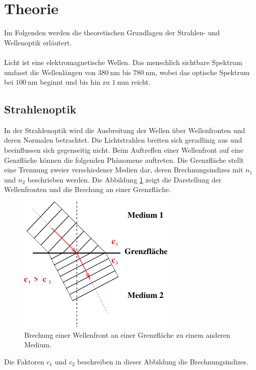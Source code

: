 \section{Theorie}

    Im Folgenden werden die theoretischen Grundlagen der Strahlen- und Wellenoptik erläutert.\\
    \\
    Licht ist eine elektromagnetische Wellen.
    Das menschlich sichtbare Spektrum umfasst die Wellenlängen von $\SI{380}{\nano\meter}$ bis $\SI{780}{\nano\meter}$,
    wobei das optische Spektrum bei $\SI{100}{\nano\meter}$ beginnt und bis hin zu $\SI{1}{\milli\meter}$ reicht.

\subsection{Strahlenoptik}

    In der Strahlenoptik wird die Ausbreitung der Wellen über Wellenfronten und deren Normalen betrachtet.
    Die Lichtstrahlen breiten sich geradlinig aus und beeinflussen sich gegenseitig nicht.
    Beim Auftreffen einer Wellenfront auf eine Genzfläche können die folgenden Phänomene auftreten.
    Die Grenzfläche stellt eine Trennung zweier verschiedener Medien dar,
    deren Brechnungsindizes mit $n_1$ und $n_2$ beschrieben werden.
    Die Abbildung \ref{fig:wellenfront} zeigt die Darstellung der Wellenfronten und die Brechung an einer Grenzfläche.
    \begin{figure}[H]
        \centering
        \includegraphics[scale=1]{content/img/Abb_1.pdf}
        \caption{Brechung einer Wellenfront an einer Grenzfläche zu einem anderen Medium.}
        \label{fig:wellenfront}
    \end{figure}
    Die Faktoren $c_1$ und $c_2$ beschreiben in dieser Abbildung die Brechnungsindizes.

